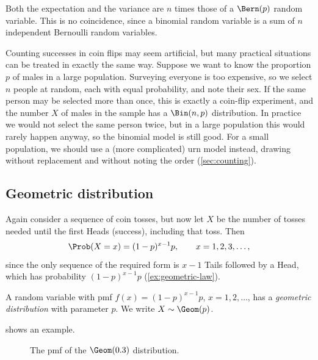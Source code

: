Both the expectation and the variance are $n$ times those of a $\Bern(p)$ random variable. This is no coincidence, since a binomial random variable is a sum of $n$ independent Bernoulli random variables.

\begin{remark}\label{rem:binomial-sampling}
Counting successes in coin flips may seem artificial, but many practical situations can be treated in exactly the same way. Suppose we want to know the proportion $p$ of males in a large population. Surveying everyone is too expensive, so we select $n$ people at random, each with equal probability, and note their sex. If the same person may be selected more than once, this is exactly a coin-flip experiment, and the number $X$ of males in the sample has a $\Bin(n, p)$ distribution. In practice we would not select the same person twice, but in a large population this would rarely happen anyway, so the binomial model is still good. For a small population, we should use a (more complicated) urn model instead, drawing without replacement and without noting the order (\cref{sec:counting}).
\end{remark}

\subsection{Geometric distribution}\label{sec:geometric}

Again consider a sequence of coin tosses, but now let $X$ be the number of tosses needed until the first Heads (success), including that toss. Then
\[
  \Prob(X = x) = (1 - p)^{x-1} p, \qquad x = 1, 2, 3, \ldots,
\]
since the only sequence of the required form is $x - 1$ Tails followed by a Head, which has probability $(1-p)^{x-1}p$ (\cref{ex:geometric-law}).

\begin{definition}\label{def:geometric}
A random variable with pmf $f(x) = (1-p)^{x-1} p$, $x = 1, 2, \ldots$, has a \emph{geometric distribution} with parameter $p$. We write $X \sim \Geom(p)$.
\end{definition}

 shows an example.

\begin{figure}[ht]
\centering
{}
\caption{The pmf of the $\Geom(0.3)$ distribution.}
\label{fig:geometric-pmf}
\end{figure}


